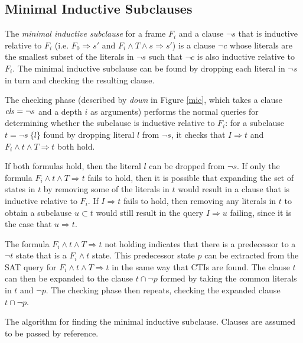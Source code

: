\documentclass[12pt,a4paper,twoside,openright]{report}
\begin{document}
{\subsection{Minimal Inductive Subclauses}
The \emph{minimal inductive subclause} for a frame $F_i$ and a clause $\neg s$ that
is inductive relative to $F_i$
(i.e. $F_0 \Rightarrow s'$ and $F_i \wedge T \wedge s \Rightarrow s'$)
is a clause $\neg c$ whose
literals are the smallest subset of the literals in $\neg s$ such that
$\neg c$ is also inductive relative to $F_i$.
The minimal inductive subclause can be found by dropping each literal
in $\neg s$ in turn and checking the resulting clause.

The checking phase (described by {\it down} in Figure \ref{mic},
which takes a clause ${\it cls} = \neg s$ and a depth $i$ as arguments)
performs the normal queries
for determining whether the subclause is inductive relative to
$F_i$: for a subclause $t = \neg s \ \{l\}$ found by dropping
literal $l$ from $\neg s$, it checks that
$I \Rightarrow t$ and $F_i \wedge t \wedge T \Rightarrow t$ both hold.

If both formulas hold, then the literal $l$ can be dropped from $\neg s$.
If only the formula $F_i \wedge t \wedge T \Rightarrow t$ fails to hold, then
it is possible that expanding the set of states in $t$ by removing some of the
literals in $t$ would result in a clause that is inductive relative to $F_i$.
If $I \Rightarrow t$ fails to hold, then removing any literals in $t$ to
obtain a subclause $u \subset t$ would still result in the query $I \Rightarrow u$
failing, since it is the case that $u \Rightarrow t$.

The formula $F_i \wedge t \wedge T \Rightarrow t$ not holding indicates
that there is a predecessor to a $\neg t$ state that is a $F_i \wedge t$ state.
This predecessor state $p$ can be extracted from the SAT query for
$F_i \wedge t \wedge T \Rightarrow t$ in the same way that CTIs are found.
The clause $t$ can then be expanded to the clause $t \cap \neg p$
formed by taking the common literals in $t$ and $\neg p$.
The checking phase then repeats, checking the expanded clause $t \cap \neg p$.

\begin{algorithm}[t]
\DontPrintSemicolon
{}
\caption{The algorithm for finding the minimal inductive subclause. Clauses are assumed
to be passed by reference.}
\label{mic}
\end{algorithm}

}
\end{document}
